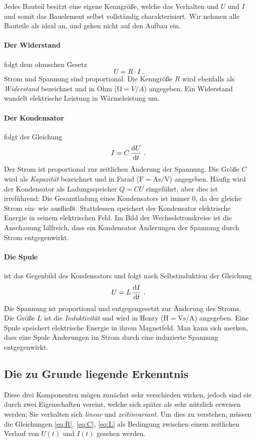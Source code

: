 Jedes Bauteil besitzt eine eigene Kenngröße, welche das Verhalten und $U$ und $I$ und somit das Bauelement selbst
vollständig charakterisiert. Wir nehmen alle Bauteile als ideal an, und gehen nicht auf den Aufbau ein.
\paragraph*{Der Widerstand} folgt dem ohmschen Gesetz
\begin{equation}\label{eq:R}
    U = R\cdot I ~.
\end{equation}
Strom und Spannung sind proportional. Die Kenngröße $R$ wird ebenfalls als \emph{Widerstand} bezeichnet und in Ohm
($\si{\ohm} = \si{V}/\si{A}$) angegeben. Ein Widerstand wandelt elektrische Leistung in Wärmeleistung um.
\paragraph*{Der Kondensator}
folgt der Gleichung
\begin{equation}\label{eq:C}
    I = C\,\dv{U}{t} ~.
\end{equation}
Der Strom ist proportional zur zeitlichen Änderung der Spannung. Die Größe $C$ wird als \emph{Kapazität} bezeichnet und
in Farad ($\si{\farad} = \si{\ampere\second}/\si{\volt}$) angegeben. Häufig wird der Kondensator als Ladungsspeicher $Q
= CU$ eingeführt, aber dies ist irreführend: Die Gesamtladung eines Kondensators ist immer 0, da der gleiche Strom ein-
wie ausfließt. Stattdessen speichert der Kondensator elektrische Energie in seinem elektrischen Feld. Im Bild der
Wechselstromkreise ist die Anschauung hilfreich, dass ein Kondensator Änderungen der Spannung durch Strom entgegenwirkt.
\paragraph*{Die Spule}
ist das Gegenbild des Kondensators und folgt nach Selbstinduktion der Gleichung
\begin{equation}\label{eq:L}
    U = L\,\dv{I}{t} ~.
\end{equation}
Die Spannung ist proportional und entgegengesetzt zur Änderung des Stroms. Die Größe $L$ ist die \emph{Induktivität} und
wird in Henry ($\si{\henry} = \si{\volt\second}/\si{\ampere}$) angegeben. Eine Spule speichert elektrische Energie in
ihrem Magnetfeld. Man kann sich merken, dass eine Spule Änderungen im Strom durch eine induzierte Spannung
entgegenwirkt.
\subsection{Die zu Grunde liegende Erkenntnis}
Diese drei Komponenten mögen zunächst sehr verschieden wirken, jedoch sind sie durch zwei Eigenschaften vereint, welche
sich später als sehr nützlich erweisen werden: Sie verhalten sich \emph{linear} und \emph{zeitinvariant}. Um dies zu
verstehen, müssen die Gleichungen \eqref{eq:R}, \eqref{eq:C}, \eqref{eq:L} als Bedingung zwischen einem zeitlichen
Verlauf von $U(t)$ und $I(t)$ gesehen werden.

